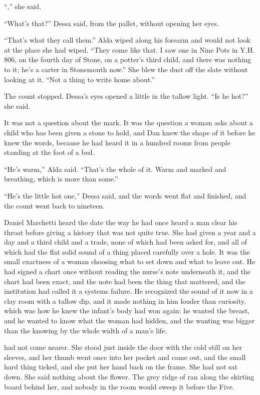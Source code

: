“,” she said.

“What's that?” Dessa said, from the pallet, without opening her eyes.

“That's what they call them.” Alda wiped along his forearm and would not look at the place she had wiped. “They come like that. I saw one in Nine Pots in Y.H. 806, on the fourth day of Stone, on a potter's third child, and there was nothing to it; he's a carter in Stonemouth now.” She blew the dust off the slate without looking at it. “Not a thing to write home about.”

The count stopped. Dessa's eyes opened a little in the tallow light. “Is he hot?” she said.

It was not a question about the mark. It was the question a woman asks about a child who has been given a stone to hold, and Dan knew the shape of it before he knew the words, because he had heard it in a hundred rooms from people standing at the foot of a bed.

“He's warm,” Alda said. “That's the whole of it. Warm and marked and breathing, which is more than some.”

“He's the little hot one,” Dessa said, and the words went flat and finished, and the count went back to nineteen.

Daniel Marchetti heard the date the way he had once heard a man clear his throat before giving a history that was not quite true. She had given a year and a day and a third child and a trade, none of which had been asked for, and all of which had the flat solid sound of a thing placed carefully over a hole. It was the small exactness of a woman choosing what to set down and what to leave out. He had signed a chart once without reading the nurse's note underneath it, and the chart had been exact, and the note had been the thing that mattered, and the institution had called it a systems failure. He recognized the sound of it now in a clay room with a tallow dip, and it made nothing in him louder than curiosity, which was how he knew the infant's body had won again: he wanted the breast, and he wanted to know what the woman had hidden, and the wanting was bigger than the knowing by the whole width of a man's life.

 had not come nearer. She stood just inside the door with the cold still on her sleeves, and her thumb went once into her pocket and came out, and the small hard thing ticked, and she put her hand back on the frame. She had not sat down. She said nothing about the flower. The grey ridge of  ran along the skirting board behind her, and nobody in the room would sweep it before the Five.

